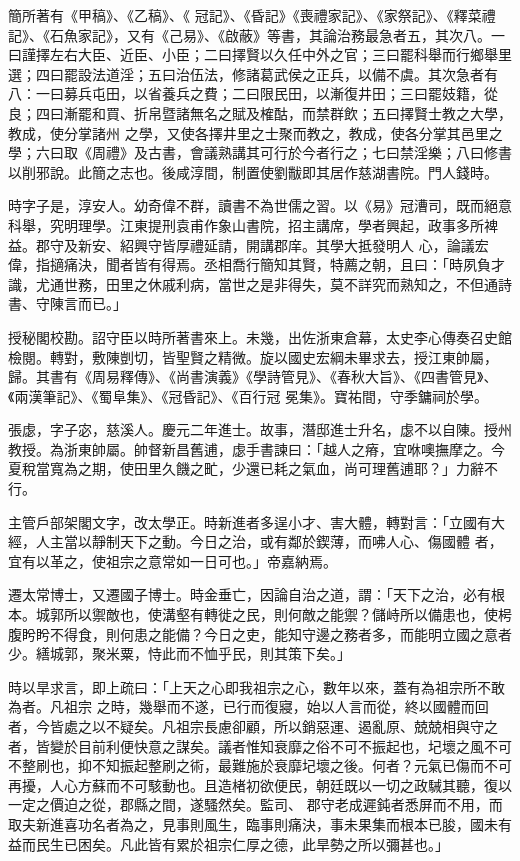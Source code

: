 \begin{pinyinscope}
 簡所著有《甲稿》、《乙稿》、《
 冠記》、《昏記》《喪禮家記》、《家祭記》、《釋菜禮記》、《石魚家記》，又有《己易》、《啟蔽》等書，其論治務最急者五，其次八。一曰謹擇左右大臣、近臣、小臣；二曰擇賢以久任中外之官；三曰罷科舉而行鄉舉里選；四曰罷設法道淫；五曰治伍法，修諸葛武侯之正兵，以備不虞。其次急者有八：一曰募兵屯田，以省養兵之費；二曰限民田，以漸復井田；三曰罷妓籍，從良；四曰漸罷和買、折帛暨諸無名之賦及榷酤，而禁群飲；五曰擇賢士教之大學，教成，使分掌諸州
 之學，又使各擇井里之士聚而教之，教成，使各分掌其邑里之學；六曰取《周禮》及古書，會議熟講其可行於今者行之；七曰禁淫樂；八曰修書以削邪說。此簡之志也。後咸淳間，制置使劉黻即其居作慈湖書院。門人錢時。



 時字子是，淳安人。幼奇偉不群，讀書不為世儒之習。以《易》冠漕司，既而絕意科舉，究明理學。江東提刑袁甫作象山書院，招主講席，學者興起，政事多所裨益。郡守及新安、紹興守皆厚禮延請，開講郡庠。其學大抵發明人
 心，論議宏偉，指擿痛決，聞者皆有得焉。丞相喬行簡知其賢，特薦之朝，且曰：「時夙負才識，尤通世務，田里之休戚利病，當世之是非得失，莫不詳究而熟知之，不但通詩書、守陳言而已。」



 授秘閣校勘。詔守臣以時所著書來上。未幾，出佐浙東倉幕，太史李心傳奏召史館檢閱。轉對，敷陳剴切，皆聖賢之精微。旋以國史宏綱未畢求去，授江東帥屬，歸。其書有《周易釋傳》、《尚書演義》《學詩管見》、《春秋大旨》、《四書管見》、《兩漢筆記》、《蜀阜集》、《冠昏記》、《百行冠
 冕集》。寶祐間，守季鏞祠於學。



 張虙，字子宓，慈溪人。慶元二年進士。故事，潛邸進士升名，虙不以自陳。授州教授。為浙東帥屬。帥督新昌舊逋，虙手書諫曰：「越人之瘠，宜咻噢撫摩之。今夏稅當寬為之期，使田里久饑之甿，少還已耗之氣血，尚可理舊逋耶？」力辭不行。



 主管戶部架閣文字，改太學正。時新進者多逞小才、害大體，轉對言：「立國有大經，人主當以靜制天下之動。今日之治，或有鄰於鍥薄，而咈人心、傷國體
 者，宜有以革之，使祖宗之意常如一日可也。」帝嘉納焉。



 遷太常博士，又遷國子博士。時金垂亡，因論自治之道，謂：「天下之治，必有根本。城郭所以禦敵也，使溝壑有轉徙之民，則何敵之能禦？儲峙所以備患也，使枵腹盻盻不得食，則何患之能備？今日之吏，能知守邊之務者多，而能明立國之意者少。繕城郭，聚米粟，恃此而不恤乎民，則其策下矣。」



 時以旱求言，即上疏曰：「上天之心即我祖宗之心，數年以來，蓋有為祖宗所不敢為者。凡祖宗
 之時，幾舉而不遂，已行而復寢，始以人言而從，終以國體而回者，今皆處之以不疑矣。凡祖宗長慮卻顧，所以銷惡運、遏亂原、兢兢相與守之者，皆變於目前利便快意之謀矣。議者惟知衰靡之俗不可不振起也，圮壞之風不可不整刷也，抑不知振起整刷之術，最難施於衰靡圮壞之後。何者？元氣已傷而不可再擾，人心方蘇而不可駭動也。且造楮初欲便民，朝廷既以一切之政駴其聽，復以一定之價迫之從，郡縣之間，遂騷然矣。監司、
 郡守老成遲鈍者悉屏而不用，而取夫新進喜功名者為之，見事則風生，臨事則痛決，事未果集而根本已朘，國未有益而民生已困矣。凡此皆有累於祖宗仁厚之德，此旱勢之所以彌甚也。」




\end{pinyinscope}
